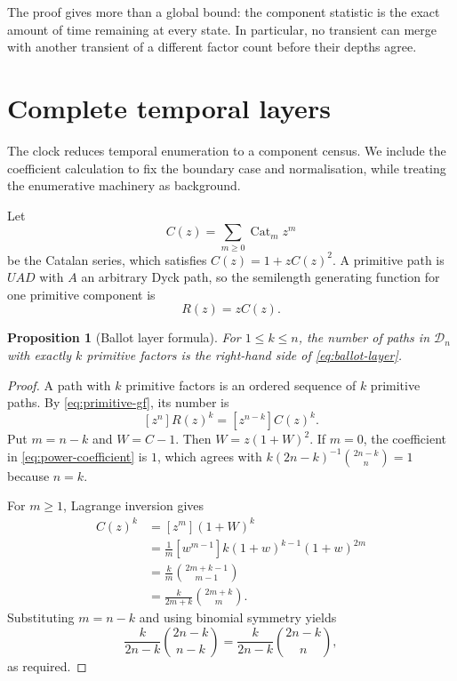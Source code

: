\documentclass[10pt,a4paper]{amsart}
\newtheorem{proposition}[theorem]{Proposition}
\theoremstyle{definition}
\theoremstyle{remark}
\newcommand{\Dyck}{\mathcal D}
\newcommand{\Cat}{\operatorname{Cat}}
\begin{document}
The proof gives more than a global bound: the component statistic is the
exact amount of time remaining at every state.  In particular, no transient
can merge with another transient of a different factor count before their
depths agree.

\section{Complete temporal layers}\label{sec:layers}

The clock reduces temporal enumeration to a component census.  We include the
coefficient calculation to fix the boundary case and normalisation, while
treating the enumerative machinery as background.

Let
\[
                 C(z)=\sum_{m\geq0}\Cat_m z^m
\]
be the Catalan series, which satisfies $C(z)=1+zC(z)^2$.  A primitive path is
$UAD$ with $A$ an arbitrary Dyck path, so the semilength generating function
for one primitive component is
\begin{equation}\label{eq:primitive-gf}
                              R(z)=zC(z).
\end{equation}

\begin{proposition}[Ballot layer formula]\label{prop:layers}
For $1\leq k\leq n$, the number of paths in $\Dyck_n$ with exactly $k$
primitive factors is the right-hand side of \eqref{eq:ballot-layer}.
\end{proposition}

\begin{proof}
A path with $k$ primitive factors is an ordered sequence of $k$ primitive
paths.  By \eqref{eq:primitive-gf}, its number is
\begin{equation}\label{eq:power-coefficient}
                  [z^n]R(z)^k=[z^{n-k}]C(z)^k.
\end{equation}
Put $m=n-k$ and $W=C-1$.  Then $W=z(1+W)^2$.  If $m=0$, the coefficient in
\eqref{eq:power-coefficient} is $1$, which agrees with
$k(2n-k)^{-1}\binom{2n-k}{n}=1$ because $n=k$.

For $m\geq1$, Lagrange inversion gives
\begin{align*}
 [z^m]C(z)^k
  &=[z^m](1+W)^k\\
  &=\frac{1}{m}[w^{m-1}]k(1+w)^{k-1}(1+w)^{2m}\\
  &=\frac{k}{m}\binom{2m+k-1}{m-1}\\
  &=\frac{k}{2m+k}\binom{2m+k}{m}.
\end{align*}
Substituting $m=n-k$ and using binomial symmetry yields
\[
             \frac{k}{2n-k}\binom{2n-k}{n-k}
             =\frac{k}{2n-k}\binom{2n-k}{n},
\]
as required.
\end{proof}
\end{document}
